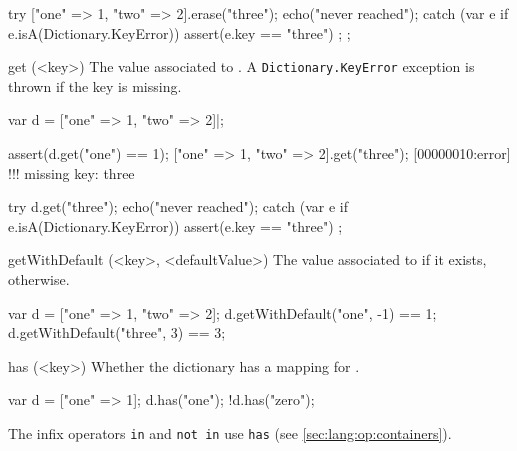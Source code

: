 \begin{urbiscriptapi}
\begin{urbiscript}
{  try
  {
    ["one" => 1, "two" => 2].erase("three");
    echo("never reached");
  }
  catch (var e if e.isA(Dictionary.KeyError))
  {
    assert(e.key == "three")
  };
};
\end{urbiscript}





\item[get](<key>)%
  The value associated to .  A \lstinline|Dictionary.KeyError|
  exception is thrown if the key is missing.
\begin{urbiscript}
var d = ["one" => 1, "two" => 2]|;

assert(d.get("one") == 1);
["one" => 1, "two" => 2].get("three");
[00000010:error] !!! missing key: three

try
{
  d.get("three");
  echo("never reached");
}
catch (var e if e.isA(Dictionary.KeyError))
{
  assert(e.key == "three")
};
\end{urbiscript}


\item[getWithDefault](<key>, <defaultValue>)%
  The value associated to  if it exists, 
  otherwise.

\begin{urbiassert}
var d = ["one" => 1, "two" => 2];
d.getWithDefault("one",  -1) == 1;
d.getWithDefault("three", 3) == 3;
\end{urbiassert}


\item[has](<key>)%
  Whether the dictionary has a mapping for .

\begin{urbiassert}
var d = ["one" => 1];
d.has("one");
!d.has("zero");
\end{urbiassert}

  The infix operators \lstinline|in| and \lstinline|not in| use
  \lstinline|has| (see \autoref{sec:lang:op:containers}).


\end{urbiscriptapi}
